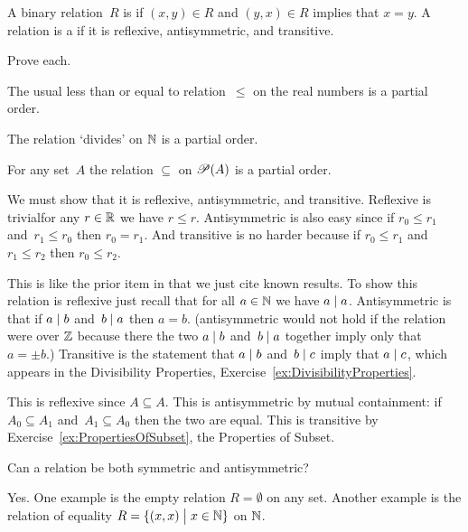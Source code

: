 \documentclass{test}  %
\begin{document}
\begin{df}
A binary relation~$R$ is  if
$(x,y)\in R$ and $(y,x)\in R$ implies that $x=y$.
A relation is a  if it is 
reflexive, antisymmetric, and transitive.  
\end{df}

\begin{ex} Prove each.
\begin{exes}
\item The usual less than or equal to relation~$\leq$ on 
the real numbers is a partial order.
\item The relation `divides' on $\mathbb{N}$ is a partial order.
\item For any set~$A$ the relation $\subseteq$ on $\mathscr{P}(A)$ is
a partial order.
\end{exes}
\begin{ans}
\begin{exes}
\item We must show that it is reflexive, antisymmetric, and transitive.
  Reflexive is trivial\Dash for any $r\in\mathbb{R}$ we have $r\leq r$.
  Antisymmetric is also easy since if $r_0\leq r_1$ and~$r_1\leq r_0$
  then $r_0=r_1$.
  And transitive is no harder because if $r_0\leq r_1$ and~$r_1\leq r_2$
  then $r_0\leq r_2$.
\item This is like the prior item in that we just cite known results.
  To show this relation is reflexive just recall that for all $a\in\mathbb{N}$ we have
  $a\mid a$.
  Antisymmetric is that if $a\mid b$ and~$b\mid a$ then
  $a=b$.
  (\remark antisymmetric would not hold if the relation were over
  $\mathbb{Z}$ because there the two $a\mid b$ and~$b\mid a$ together imply
  only that $a=\pm b$.)
  Transitive is the statement that $a\mid b$ and~$b\mid c$ imply
  that $a\mid c$, which appears
  in the Divisibility Properties, Exercise~\ref{ex:DivisibilityProperties}.
\item This is reflexive since $A\subseteq A$.
  This is antisymmetric by mutual containment: 
  if $A_0\subseteq A_1$ and~$A_1\subseteq A_0$ then the two are equal.
  This is transitive by Exercise~\ref{ex:PropertiesOfSubset}, 
  the Properties of Subset.
\end{exes}
\end{ans}
\end{ex}

\begin{ex}
Can a relation be both symmetric and antisymmetric?  
\begin{ans}
Yes.
One example is the empty relation $R=\emptyset$ on any set.
Another example is the relation of equality 
$R=\{(x,x) \bigm| x\in\mathbb{N}\}$ on $\mathbb{N}$.
\end{ans}
\end{ex}







\end{document}
